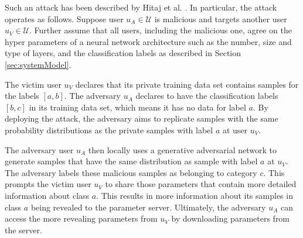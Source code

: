 \documentclass[conference]{IEEEtran}
\begin{document}





Such an attack has been described by Hitaj et al. \cite{hitaj2017deep}. In particular, the attack operates as follows. 
Suppose user $u_A\in\mathcal{U}$ is malicious and targets another user $u_V\in\mathcal{U}$. Further assume that all users, including
the malicious one, agree on the hyper parameters of a neural network architecture such as the number, size and type of layers,  and the
classification labels as described in Section \ref{sec:systemModel}.

The victim user $u_V$ declares that its private training data set contains samples for the  labels $[a,b]$. The adversary
$u_A$ declares to have the classification labels $[b,c]$ in its training data set, which means it has no data for label $a$. By
deploying the attack, the adversary aims to replicate samples with the same probability distributions as the private samples with label
$a$ at user $u_V$.

The adversary user $u_A$ then locally uses a generative adversarial network to generate samples that have the same distribution as
sample with label $a$ at $u_V$. The adversary labels these malicious samples as belonging to category $c$. This prompts the victim 
user $u_V$ to share those parameters that contain more detailed information about class $a$. This results in more information about
its samples in class $a$ being revealed to the parameter server. Ultimately, the adversary $u_A$ can access the more revealing
parameters from $u_V$ by downloading parameters from the server. 
\end{document}
